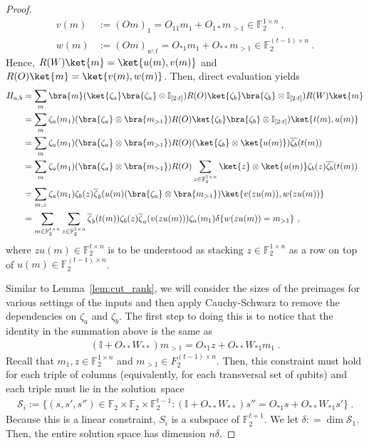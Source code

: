 \documentclass[11pt]{article}
\newcommand{\id}{\ensuremath{\mathbb{I}}}
\newcommand{\F}{\mathbb{F}}
\begin{document}
\begin{proof}
\begin{align}
    v(m) & := (Om)_1 = O_{11}m_1 + O_{1*}m_{>1} \in \F_2^{1 \times n}\ ,\\
    w(m) & := (Om)_{w:t} = O_{*1}m_1 + O_{**}m_{>1} \in \F_2^{(t-1) \times n} \ .
\end{align}
Hence, $R(W)\ket{m} = \ket{u(m),v(m)}$ and $R(O)\ket{m} = \ket{v(m),w(m)}$. Then, direct evaluation yields
\begin{align}
    H_{a,b} & = \sum_{m}\bra{m} (\ket{\zeta_a}\bra{\zeta_a}\otimes \id_{[2:t]})R(O)\ket{\zeta_b}\bra{\zeta_b}\otimes \id_{[2:t]}) R(W) \ket{m}\\
    & = \sum_{m}\zeta_a(m_1) (\bra{\zeta_a} \otimes \bra{m_{>1}})R(O)\ket{\zeta_b}\bra{\zeta_b}\otimes \id_{[2:t]}) \ket{t(m), u(m)}\\
    & = \sum_{m} \zeta_a(m_1) (\bra{\zeta_a} \otimes \bra{m_{>1}})
     R(O) (\ket{\zeta_b}\otimes \ket{u(m)}) \overline{\zeta_b}(t(m))\\
    & = \sum_m \zeta_a(m_1) (\bra{\zeta_a} \otimes \bra{m_{>1}}) R(O) \sum_{z \in \F_2^{1 \times n}} \ket{z}\otimes \ket{u(m)} \zeta_b(z) \overline{\zeta_b}(t(m))\\
    & = \sum_{m,z}  \zeta_a(m_1)\zeta_b(z)\overline{\zeta}_{b}(u(m) (\bra{\zeta_a} \otimes \bra{m_{>1}}) \ket{v(zu(m)), w(zu(m))}\\
    & = \sum_{m\in \F_2^{t \times n}} \sum_{z \in \F_2^{1 \times n}} \overline{\zeta}_{b}(t(m)) \zeta_b(z) \overline{\zeta}_a (v(zu(m))) \zeta_a(m_1) \delta\{ w(zu(m))= m_{>1} \}\label{eq:big_sum}\ ,
\end{align}
where $zu(m)\in \F_2^{t \times n}$ is to be understood as stacking $z\in\F_2^{1 \times n}$  as a row on top of $u(m) \in \F_2^{(t-1)\times n}$.

Similar to Lemma~\ref{lem:cut_rank}, we will consider the sizes of the preimages for various settings of the inputs and then apply Cauchy-Schwarz to remove the dependencies on $\zeta_a$ and $\zeta_b$. The first step to doing this is to notice that the identity in the summation above is the same as
    \begin{align}
        (\id+O_{**}W_{**})m_{>1} = O_{*1}z + O_{**}W_{*1}m_1\ .
    \end{align}
    Recall that $m_1, z \in \F_2^{1 \times n}$ and $m_{>1} \in F_2^{(t-1) \times n}$. Then, this constraint must hold for each triple of columns (equivalently, for each transversal set of qubits) and each triple must lie in the solution~space 
    \begin{align}
        \mathcal{S}_i := \{ (s,s',s'') \in \F_{2}\times \F_2 \times \F_2^{t-1}: (\id+O_{**}W_{**})s'' = O_{*1}s+O_{**}W_{*1}s' \}\ .
    \end{align}
    Because this is a linear constraint, $S_i$ is a subspace of $\F_2^{t+1}$. We let $\delta : = \dim \mathcal{S}_1$. Then, the entire solution space has dimension $n\delta$.


\end{proof}
\end{document}
